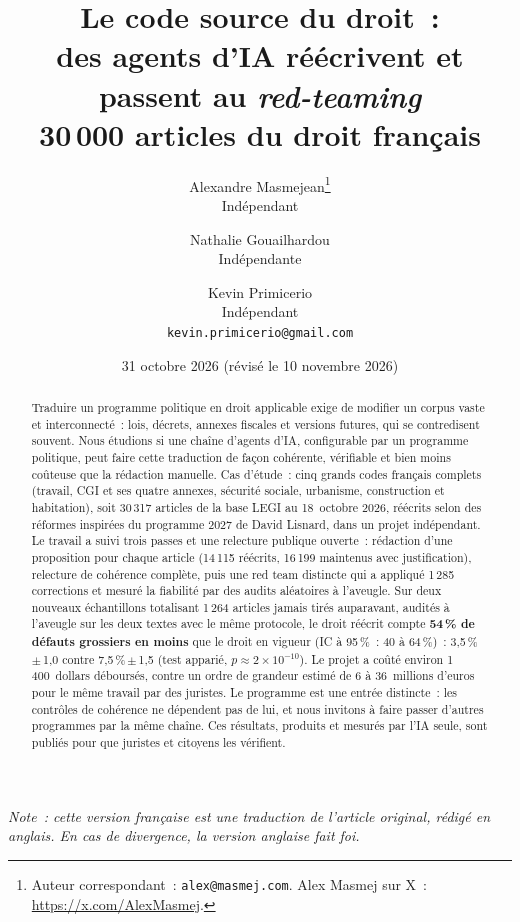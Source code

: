 \documentclass[11pt,a4paper]{article}
\title{Le code source du droit~:\\
des agents d'IA réécrivent et passent au \emph{red-teaming}\\
30\,000 articles du droit français}
\author{
  Alexandre Masmejean\thanks{Auteur correspondant~: \texttt{alex@masmej.com}. Alex Masmej sur X~: \url{https://x.com/AlexMasmej}.}\\
  \small Indépendant
  \and
  Nathalie Gouailhardou\\
  \small Indépendante
  \and
  Kevin Primicerio\\
  \small Indépendant\\
  \small\texttt{kevin.primicerio@gmail.com}
}
\date{31 octobre 2026 (révisé le 10 novembre 2026)}
\begin{document}
\maketitle

\begin{abstract}
Traduire un programme politique en droit applicable exige de modifier un corpus vaste et interconnecté~: lois, décrets, annexes fiscales et versions futures, qui se contredisent souvent. Nous étudions si une chaîne d'agents d'IA, configurable par un programme politique, peut faire cette traduction de façon cohérente, vérifiable et bien moins coûteuse que la rédaction manuelle. Cas d'étude~: cinq grands codes français complets (travail, CGI et ses quatre annexes, sécurité sociale, urbanisme, construction et habitation), soit 30\,317 articles de la base LEGI au 18~octobre 2026, réécrits selon des réformes inspirées du programme 2027 de David Lisnard, dans un projet indépendant. Le travail a suivi trois passes et une relecture publique ouverte~: rédaction d'une proposition pour chaque article (14\,115 réécrits, 16\,199 maintenus avec justification), relecture de cohérence complète, puis une red team distincte qui a appliqué 1\,285 corrections et mesuré la fiabilité par des audits aléatoires à l'aveugle. Sur deux nouveaux échantillons totalisant 1\,264 articles jamais tirés auparavant, audités à l'aveugle sur les deux textes avec le même protocole, le droit réécrit compte \textbf{54\,\% de défauts grossiers en moins} que le droit en vigueur (IC à 95\,\%~: 40 à 64\,\%)~: 3,5\,\%\,$\pm$\,1,0 contre 7,5\,\%\,$\pm$\,1,5 (test apparié, $p \approx 2\times10^{-10}$). Le projet a coûté environ 1\,400~dollars déboursés, contre un ordre de grandeur estimé de 6 à 36~millions d'euros pour le même travail par des juristes. Le programme est une entrée distincte~: les contrôles de cohérence ne dépendent pas de lui, et nous invitons à faire passer d'autres programmes par la même chaîne. Ces résultats, produits et mesurés par l'IA seule, sont publiés pour que juristes et citoyens les vérifient.
\end{abstract}

\begin{center}
\parbox{0.9\linewidth}{\small\emph{Note~: cette version française est une traduction de l'article original, rédigé en anglais. En cas de divergence, la version anglaise fait foi.}}
\end{center}
\end{document}

